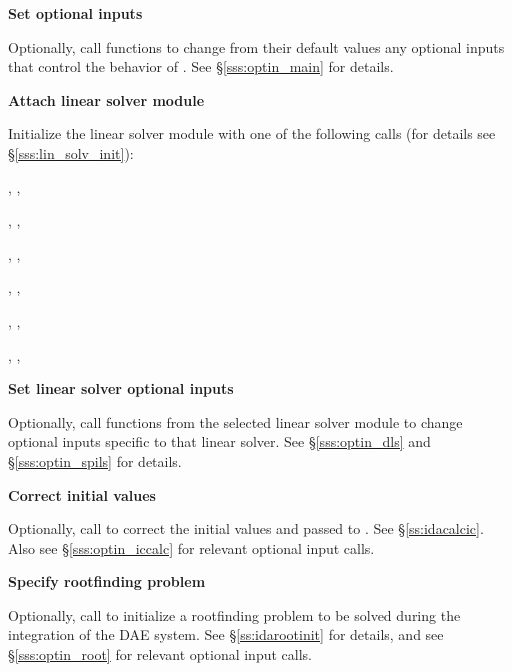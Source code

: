 \begin{Steps}
\item
  {\bf Set optional inputs}

  Optionally, call  functions to change from their default values any
  optional inputs that control the behavior of {\idas}.
  See \S\ref{sss:optin_main} for details.

\item\label{i:lin_solver} 
  {\bf Attach linear solver module}

  Initialize the linear solver module
  with one of the following calls (for details see \S\ref{sss:lin_solv_init}):

  {\s, \omp, \pt} 

  {\s, \omp, \pt} 

  {\s, \omp, \pt} 

  {\s, \omp, \pt} 

  {\s, \omp, \pt} 

  {\s, \omp, \pt} 




\item
  {\bf Set linear solver optional inputs}

  Optionally, call  functions from the selected linear solver module to
  change optional inputs specific to that linear solver.
  See \S\ref{sss:optin_dls} and \S\ref{sss:optin_spils} for details.

\item 
  {\bf Correct initial values}

  Optionally, call  to correct the initial values
   and  passed to .  See \S\ref{ss:idacalcic}.
  Also see \S\ref{sss:optin_iccalc} for relevant optional input calls.

\item
  {\bf Specify rootfinding problem}

  Optionally, call  to initialize a rootfinding problem
  to be solved during the integration of the DAE system.
  See \S\ref{ss:idarootinit} for details, and see \S\ref{sss:optin_root}
  for relevant optional input calls.


\end{Steps}
